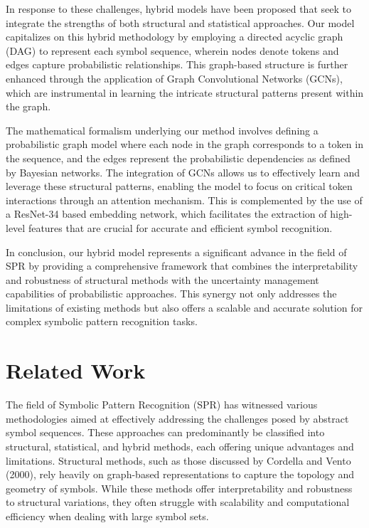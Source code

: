 \documentclass{article}
\begin{document}
In response to these challenges, hybrid models have been proposed that seek to integrate the strengths of both structural and statistical approaches. Our model capitalizes on this hybrid methodology by employing a directed acyclic graph (DAG) to represent each symbol sequence, wherein nodes denote tokens and edges capture probabilistic relationships. This graph-based structure is further enhanced through the application of Graph Convolutional Networks (GCNs), which are instrumental in learning the intricate structural patterns present within the graph.

The mathematical formalism underlying our method involves defining a probabilistic graph model where each node in the graph corresponds to a token in the sequence, and the edges represent the probabilistic dependencies as defined by Bayesian networks. The integration of GCNs allows us to effectively learn and leverage these structural patterns, enabling the model to focus on critical token interactions through an attention mechanism. This is complemented by the use of a ResNet-34 based embedding network, which facilitates the extraction of high-level features that are crucial for accurate and efficient symbol recognition.

In conclusion, our hybrid model represents a significant advance in the field of SPR by providing a comprehensive framework that combines the interpretability and robustness of structural methods with the uncertainty management capabilities of probabilistic approaches. This synergy not only addresses the limitations of existing methods but also offers a scalable and accurate solution for complex symbolic pattern recognition tasks.

\section{Related Work}
The field of Symbolic Pattern Recognition (SPR) has witnessed various methodologies aimed at effectively addressing the challenges posed by abstract symbol sequences. These approaches can predominantly be classified into structural, statistical, and hybrid methods, each offering unique advantages and limitations. Structural methods, such as those discussed by Cordella and Vento (2000), rely heavily on graph-based representations to capture the topology and geometry of symbols. While these methods offer interpretability and robustness to structural variations, they often struggle with scalability and computational efficiency when dealing with large symbol sets.
\end{document}
